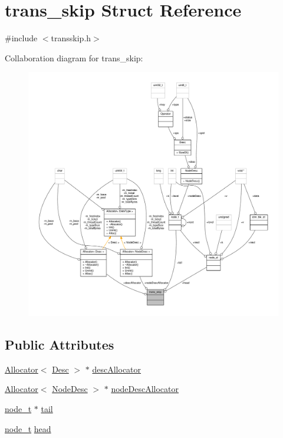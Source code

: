 \hypertarget{structtrans__skip}{\section{trans\-\_\-skip Struct Reference}
\label{structtrans__skip}
}


{\ttfamily \#include $<$transskip.\-h$>$}



Collaboration diagram for trans\-\_\-skip\-:
\nopagebreak
\begin{figure}[H]
\begin{center}
\leavevmode
\includegraphics[width=350pt]{structtrans__skip__coll__graph}
\end{center}
\end{figure}
\subsection*{Public Attributes}
\begin{DoxyCompactItemize}
\item 
\hyperlink{classAllocator}{Allocator}$<$ \hyperlink{structDesc}{Desc} $>$ $\ast$ \hyperlink{structtrans__skip_a7bd5096f4e55a68c1a236daa3fa41404}{desc\-Allocator}
\item 
\hyperlink{classAllocator}{Allocator}$<$ \hyperlink{structNodeDesc}{Node\-Desc} $>$ $\ast$ \hyperlink{structtrans__skip_ac7306fc6b2482c73b573af62357490c3}{node\-Desc\-Allocator}
\item 
\hyperlink{structnode__t}{node\-\_\-t} $\ast$ \hyperlink{structtrans__skip_a8b83e966c26cafbacb33d797167e823b}{tail}
\item 
\hyperlink{structnode__t}{node\-\_\-t} \hyperlink{structtrans__skip_af0d0d3b556f1dd198c3a7c55410e51f0}{head}
\end{DoxyCompactItemize}



